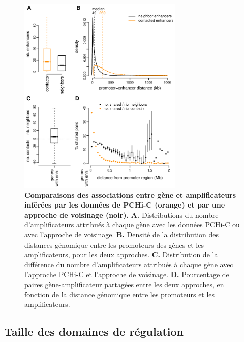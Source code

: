 \begin{figure}[hbt!]
 \centering
 \includegraphics[width=0.7\textwidth, page=1]{figures/chap2/chap2-fig5.pdf}
 \caption[Comparaisons des associations entre gène et \glspl{amplificateur} inférées par les données de \gls{PCHi-C} et par une approche de voisinage.]{
 \textbf{Comparaisons des associations entre gène et \glspl{amplificateur} inférées par les données de \gls{PCHi-C} (orange) et par une approche de voisinage (noir).}
 \textbf{A.} Distributions du nombre d'\glspl{amplificateur} attribués à chaque gène avec les données \gls{PCHi-C} ou avec l'approche de voisinage.
 \textbf{B.} Densité de la distribution des distances génomique entre les promoteurs des gènes et les amplificateurs, pour les deux approches. 
 \textbf{C.} Distribution de la différence du nombre d'\glspl{amplificateur} attribués à chaque gène avec l'approche \gls{PCHi-C} et l'approche de voisinage. 
 \textbf{D.} Pourcentage de paires gène-\gls{amplificateur} partagées entre les deux approches, en fonction de la distance génomique entre les promoteurs et les amplificateurs.\\
 }
 \label{fig:chap2-fig5}
\end{figure} 

\subsection{Taille des domaines de régulation}
\label{subsec:taille-domaine}

